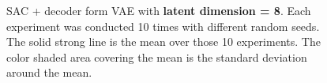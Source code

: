 \begin{figure}
    \begin{center}
        \hfill
    \end{center}
    \caption[SAC + VAE on latent dim = 8]{SAC + decoder form VAE with \textbf{latent dimension = 8}. Each experiment was conducted 10 times with different random seeds. The solid strong line is the mean over those 10 experiments. The color shaded area covering the mean is the standard deviation around the mean.}
    \label{fig:SAC_latent_8}
\end{figure}
